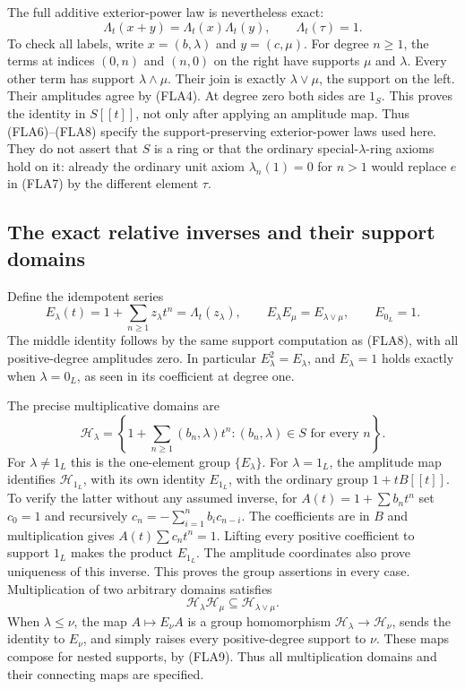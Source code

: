 The full additive exterior-power law is nevertheless exact:
\begin{equation}\tag{FLA8}
 \Lambda_t(x+y)=\Lambda_t(x)\Lambda_t(y),\qquad
 \Lambda_t(\tau)=1.
\end{equation}
To check all labels, write $x=(b,\lambda)$ and $y=(c,\mu)$.
For degree $n\ge1$, the terms at indices $(0,n)$ and $(n,0)$
on the right have supports $\mu$ and $\lambda$. Every other
term has support $\lambda\wedge\mu$. Their join is exactly
$\lambda\vee\mu$, the support on the left. Their amplitudes
agree by (FLA4). At degree zero both sides are $1_S$. This proves
the identity in $S[[t]]$, not only after applying an amplitude map.
Thus (FLA6)--(FLA8) specify the support-preserving exterior-power
laws used here. They do not assert that $S$ is a ring or that the
ordinary special-$\lambda$-ring axioms hold on it: already the
ordinary unit axiom $\lambda_n(1)=0$ for $n>1$ would replace
$e$ in (FLA7) by the different element $\tau$.

\subsection{The exact relative inverses and their support domains}

Define the idempotent series
\begin{equation}\tag{FLA9}
 E_\lambda(t)=1+\sum_{n\ge1}z_\lambda t^n
       =\Lambda_t(z_\lambda),\qquad
 E_\lambda E_\mu=E_{\lambda\vee\mu},\qquad E_{0_L}=1.
\end{equation}
The middle identity follows by the same support computation as
(FLA8), with all positive-degree amplitudes zero. In particular
$E_\lambda^2=E_\lambda$, and $E_\lambda=1$ holds exactly when
$\lambda=0_L$, as seen in its coefficient at degree one.

The precise multiplicative domains are
\begin{equation}\tag{FLA10}
 \mathcal H_\lambda=
 \left\{1+\sum_{n\ge1}(b_n,\lambda)t^n:
                   (b_n,\lambda)\in S\text{ for every }n\right\}.
\end{equation}
For $\lambda\ne1_L$ this is the one-element group $\{E_\lambda\}$.
For $\lambda=1_L$, the amplitude map identifies $\mathcal H_{1_L}$,
with its own identity $E_{1_L}$, with the ordinary group
$1+tB[[t]]$. To verify the latter without any assumed inverse,
for $A(t)=1+\sum b_nt^n$ set $c_0=1$ and recursively
$c_n=-\sum_{i=1}^n b_i c_{n-i}$. The coefficients are in $B$
and multiplication gives $A(t)\sum c_nt^n=1$. Lifting every
positive coefficient to support $1_L$ makes the product
$E_{1_L}$. The amplitude coordinates also prove uniqueness of
this inverse. This proves the group assertions in every case.
Multiplication of two arbitrary domains satisfies
\begin{equation}\tag{FLA11}
 \mathcal H_\lambda\mathcal H_\mu
           \subseteq\mathcal H_{\lambda\vee\mu}.
\end{equation}
When $\lambda\le\nu$, the map $A\mapsto E_\nu A$ is a group
homomorphism $\mathcal H_\lambda\to\mathcal H_\nu$, sends the
identity to $E_\nu$, and simply raises every positive-degree
support to $\nu$. These maps compose for nested supports, by
(FLA9). Thus all multiplication domains and their connecting maps
are specified.

